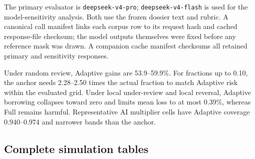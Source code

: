 The primary evaluator is \texttt{deepseek-v4-pro};
\texttt{deepseek-v4-flash} is used for the model-sensitivity analysis. Both use
the frozen dossier text and rubric. A canonical call manifest links each
corpus row to its request hash and cached response-file checksum; the model
outputs themselves were fixed before any reference mask was drawn. A companion
cache manifest checksums all retained primary and sensitivity responses.

Under random review, Adaptive gains are 53.9--59.9\%. For fractions up to 0.10,
the anchor needs 2.28--2.50 times the actual fraction to match Adaptive risk
within the evaluated grid. Under local under-review and local reversal,
Adaptive borrowing collapses toward zero and limits mean loss to at most
0.39\%, whereas Full remains harmful. Representative AI multiplier cells have
Adaptive coverage 0.940--0.974 and narrower bands than the anchor.

\subsection{Complete simulation tables}







\clearpage
